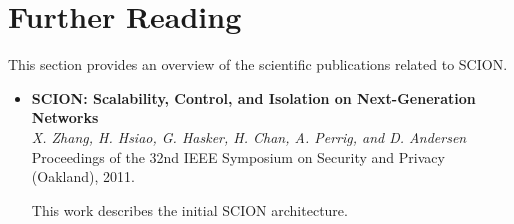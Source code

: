 \section{Further Reading}

This section provides an overview of the scientific publications related to SCION.

\begin{itemize}

\item[\cite{ZHHCPA2011}] \textbf{SCION: Scalability, Control, and Isolation on Next-Generation Networks}\\
\textit{X. Zhang, H. Hsiao, G. Hasker, H. Chan, A. Perrig, and D. Andersen} \\
{\footnotesize Proceedings of the 32nd IEEE Symposium on Security and Privacy (Oakland), 2011.}

This work describes the initial SCION architecture. 



\end{itemize}


